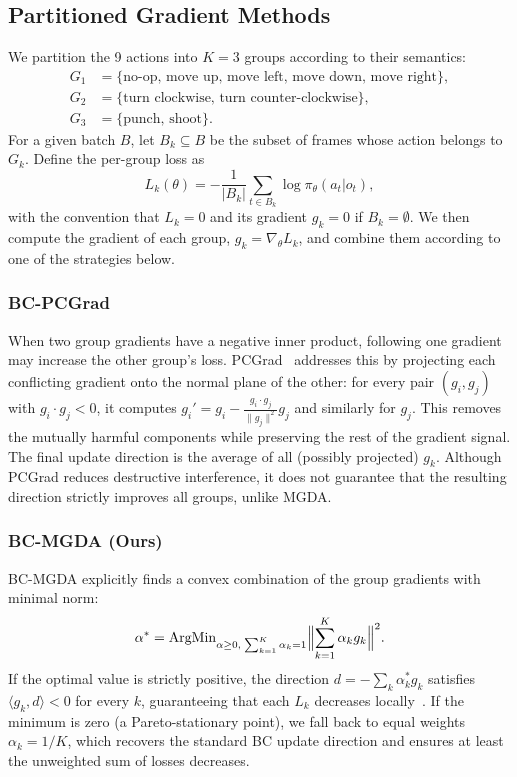 \documentclass[conference]{IEEEtran}
\begin{document}
\subsection{Partitioned Gradient Methods}
We partition the 9 actions into $K=3$ groups according to their semantics:
\begin{align*}
G_1 &= \{\text{no-op, move up, move left, move down, move right}\},\\
G_2 &= \{\text{turn clockwise, turn counter-clockwise}\},\\
G_3 &= \{\text{punch, shoot}\}.
\end{align*}
For a given batch $B$, let $B_k \subseteq B$ be the subset of frames whose action belongs to $G_k$.
Define the per-group loss as
\begin{equation}
L_k(\theta) = -\frac{1}{|B_k|}\sum_{t \in B_k} \log \pi_\theta(a_t|o_t),
\label{eq:group_loss}
\end{equation}
with the convention that $L_k = 0$ and its gradient $g_k = 0$ if $B_k = \emptyset$.
We then compute the gradient of each group, $g_k = \nabla_\theta L_k$, and combine them according to one of the strategies below.

\subsubsection{BC-PCGrad}
When two group gradients have a negative inner product, following one gradient may increase the other group's loss. PCGrad~\cite{yu2020gradient} addresses this by projecting each conflicting gradient onto the normal plane of the other: for every pair $(g_i,g_j)$ with $g_i\!\cdot\!g_j < 0$, it computes $g_i' = g_i - \frac{g_i\cdot g_j}{\|g_j\|^2}g_j$ and similarly for $g_j$. This removes the mutually harmful components while preserving the rest of the gradient signal. The final update direction is the average of all (possibly projected) $g_k$. Although PCGrad reduces destructive interference, it does not guarantee that the resulting direction strictly improves all groups, unlike MGDA.

\subsubsection{BC-MGDA (Ours)}
BC-MGDA explicitly finds a convex combination of the group gradients with minimal norm:
\begin{equation}
\alpha^* = \text{ArgMin}_{\alpha\ge 0,\;\sum_{k=1}^K \alpha_k = 1} \Bigl\|\sum_{k=1}^K \alpha_k g_k\Bigr\|^2.
\label{eq:mgda}
\end{equation}
If the optimal value is strictly positive, the direction $d = -\sum_k \alpha_k^* g_k$ satisfies $\langle g_k, d\rangle < 0$ for every $k$, guaranteeing that each $L_k$ decreases locally~\cite{desideri2012multiple}. If the minimum is zero (a Pareto-stationary point), we fall back to equal weights $\alpha_k = 1/K$, which recovers the standard BC update direction and ensures at least the unweighted sum of losses decreases.
\end{document}

